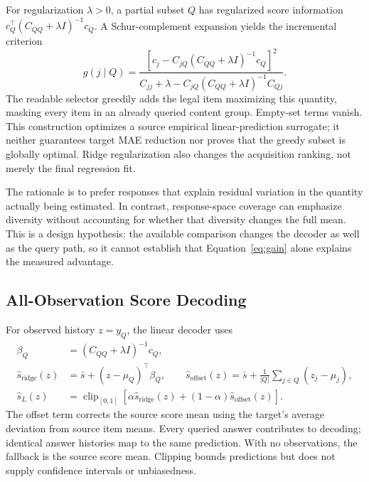 \documentclass{article}
\newcommand{\clip}{\operatorname{clip}_{[0,1]}}
\begin{document}
For regularization $\lambda>0$, a partial subset $Q$ has regularized score information $c_Q^\top(C_{QQ}+\lambda I)^{-1}c_Q$. A Schur-complement expansion yields the incremental criterion
\begin{equation}
g(j\mid Q)=
\frac{\left[c_j-C_{jQ}(C_{QQ}+\lambda I)^{-1}c_Q\right]^2}
{C_{jj}+\lambda-C_{jQ}(C_{QQ}+\lambda I)^{-1}C_{Qj}}.
\label{eq:gain}
\end{equation}
The readable selector greedily adds the legal item maximizing this quantity, masking every item in an already queried content group. Empty-set terms vanish. This construction optimizes a source empirical linear-prediction surrogate; it neither guarantees target MAE reduction nor proves that the greedy subset is globally optimal. Ridge regularization also changes the acquisition ranking, not merely the final regression fit.

The rationale is to prefer responses that explain residual variation in the quantity actually being estimated. In contrast, response-space coverage can emphasize diversity without accounting for whether that diversity changes the full mean. This is a design hypothesis: the available comparison changes the decoder as well as the query path, so it cannot establish that Equation~\ref{eq:gain} alone explains the measured advantage.

\subsection{All-Observation Score Decoding}
For observed history $z=y_Q$, the linear decoder uses
\begin{align}
\beta_Q&=(C_{QQ}+\lambda I)^{-1}c_Q,\\
\hat s_{\mathrm{ridge}}(z)&=\bar s+(z-\mu_Q)^\top\beta_Q,\qquad
\hat s_{\mathrm{offset}}(z)=\bar s+\frac{1}{|Q|}\sum_{j\in Q}(z_j-\mu_j),\\
\hat s_L(z)&=\clip\left[\alpha\hat s_{\mathrm{ridge}}(z)+(1-\alpha)\hat s_{\mathrm{offset}}(z)\right].
\label{eq:linear}
\end{align}
The offset term corrects the source score mean using the target's average deviation from source item means. Every queried answer contributes to decoding; identical answer histories map to the same prediction. With no observations, the fallback is the source score mean. Clipping bounds predictions but does not supply confidence intervals or unbiasedness.
\end{document}
